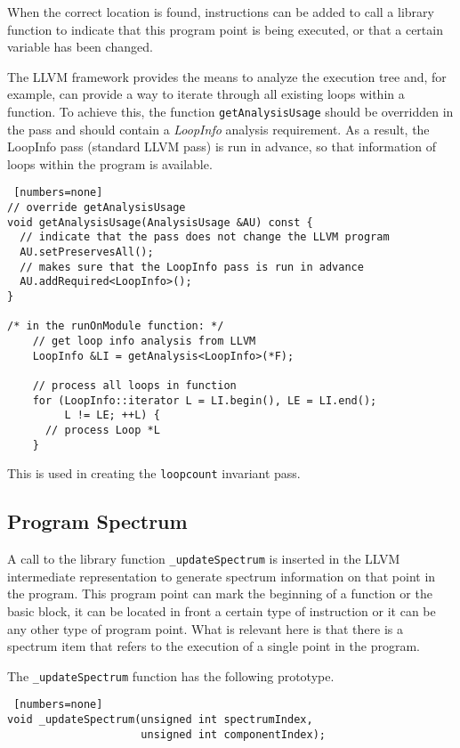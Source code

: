 When the correct location is found,
instructions can be added to call a library function
to indicate that this program point is being executed,
or that a certain variable has been changed.

The LLVM framework provides the means to analyze the
execution tree and, for example, can provide a way to
iterate through all existing loops within a function.
To achieve this, the function
\verb|getAnalysisUsage| should be overridden in the pass
and should contain a \emph{LoopInfo} analysis requirement.
As a result, the LoopInfo pass (standard LLVM pass) is run 
in advance, so that information of loops within the program
is available.

\begin{lstlisting} [numbers=none]
// override getAnalysisUsage
void getAnalysisUsage(AnalysisUsage &AU) const {
  // indicate that the pass does not change the LLVM program
  AU.setPreservesAll();
  // makes sure that the LoopInfo pass is run in advance
  AU.addRequired<LoopInfo>();
}

/* in the runOnModule function: */
    // get loop info analysis from LLVM
    LoopInfo &LI = getAnalysis<LoopInfo>(*F);

    // process all loops in function
    for (LoopInfo::iterator L = LI.begin(), LE = LI.end(); 
         L != LE; ++L) {
      // process Loop *L
    }
\end{lstlisting}

This is used in creating the \verb|loopcount| invariant pass.


\subsection{Program Spectrum}

A call to the library function \verb|_updateSpectrum| is inserted
in the LLVM intermediate representation to generate spectrum
information on that point in the program.
This program point can mark the beginning of a function or the
basic block, it can be located in front a certain type of instruction
or it can be any other type of program point.
What is relevant here is that there is a spectrum item
that refers to the execution of a single point in the program.

The \verb|_updateSpectrum| function has the following prototype.
\begin{lstlisting} [numbers=none]
void _updateSpectrum(unsigned int spectrumIndex, 
                     unsigned int componentIndex);
\end{lstlisting}

